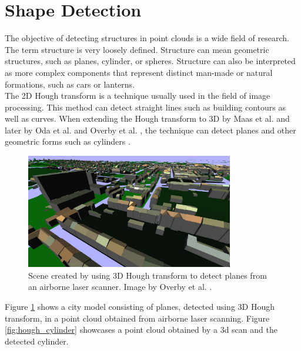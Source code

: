 \section {Shape Detection}
\label{sec:related_work_shape detection}

The objective of detecting structures in point clouds is a wide field of research. The term structure is very loosely defined. Structure can mean geometric structures, such as planes, cylinder, or spheres. Structure can also be interpreted as more complex components that represent distinct man-made or natural formations, such as cars or lanterns. 
\\
The 2D Hough transform \cite{hough1962method} is a technique usually used in the field of image processing. This method can detect straight lines such as building contours as well as curves. When extending the Hough transform to 3D by Maas et al. \cite{maas1999two} and later by Oda et al. \cite{oda2004automatic} and Overby et al. \cite{overby2004automatic}, the technique can detect planes and other geometric forms such as cylinders \cite{rabbani2005efficient}. 

\begin{figure}
    \centering
    \includegraphics[width=0.81\textwidth]{Related_Work/hough_planes.png}%
    \caption[Scene created by using 3d Hough transform to detect planes from an airborne laser scanner]
		{Scene created by using 3D Hough transform to detect planes from an airborne laser scanner. Image by Overby et al. \cite{overby2004automatic}.}
    \label{fig:hough_planes}
\end{figure}

Figure \ref{fig:hough_planes} shows a city model consisting of planes, detected using 3D Hough transform, in a point cloud obtained from airborne laser scanning. Figure \ref{fig:hough_cylinder} showcases a point cloud obtained by a 3d scan and the detected cylinder. 


